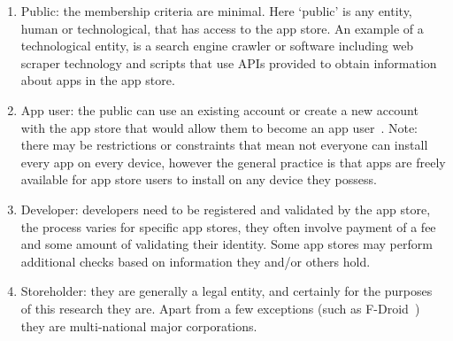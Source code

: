 \begin{enumerate}
    \item Public: the membership criteria are minimal. Here `public' is any entity, human or technological, that has access to the app store. An example of a technological entity, is a search engine crawler or software including web scraper technology and scripts that use APIs provided to obtain information about apps in the app store.
    \item App user: the public can use an existing account or create a new account with the app store that would allow them to become an app user~. Note: there may be restrictions or constraints that mean not everyone can install every app on every device, however the general practice is that apps are freely available for app store users to install on any device they possess. 
    \item Developer: developers need to be registered and validated by the app store, the process varies for specific app stores, they often involve payment of a fee and some amount of validating their identity. Some app stores may perform additional checks based on information they and/or others hold.  
    \item Storeholder: they are generally a legal entity, and certainly for the purposes of this research they are. Apart from a few exceptions (such as F-Droid~) they are multi-national major corporations.
\end{enumerate}


